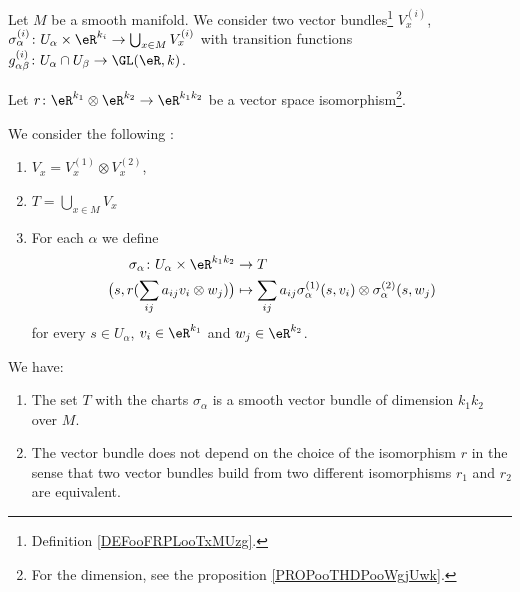 \begin{propositionDef}		\label{DEFooCSDZooJuzGuE}
	Let \( M \) be a smooth manifold. We consider two vector bundles\footnote{Definition \ref{DEFooFRPLooTxMUzg}.} \( V_x^{(i)}\), \( \sigma_{\alpha}^{(i)}  \colon U_{\alpha}\times \eR^{k_i}\to \bigcup_{x\in M}V_x^{(i)} \) with transition functions \(g_{\alpha\beta}^{(i)} \colon U_{\alpha}\cap U_{\beta}\to \GL(\eR,k)  \).

	Let \(r \colon \eR^{k_1}\otimes \eR^{k_2}\to \eR^{k_1k_2}  \) be a vector space isomorphism\footnote{For the dimension, see the proposition \ref{PROPooTHDPooWgjUwk}.}.

	We consider the following :
	\begin{enumerate}
		\item
		      \( V_x=V_x^{(1)}\otimes V_x^{(2)}\),
		\item
		      \( T=\bigcup_{x\in M}V_x\)
		\item For each \( \alpha\) we define
		      \begin{equation}		\label{EQooXHURooBpOMlU}
			      \begin{aligned}
				      \sigma_{\alpha}\colon U_{\alpha}\times \eR^{k_1k_2} & \to T                                                                                   \\
				      \big( s, r(\sum_{ij}a_{ij} v_i\otimes w_j) \big)    & \mapsto \sum_{ij}a_{ij}\sigma_{\alpha}^{(1)}(s,v_i)\otimes \sigma_{\alpha}^{(2)}(s,w_j)
			      \end{aligned}
		      \end{equation}
		      for every \( s\in U_{\alpha}\), \( v_i\in \eR^{k_1}\) and \( w_j\in \eR^{k_2}\).
	\end{enumerate}

	We have:
	\begin{enumerate}
		\item
		      The set	\( T\) with the charts \( \sigma_{\alpha} \) is a smooth vector bundle of dimension \( k_1k_2\) over \( M\).
		\item
		      The vector bundle does not depend on the choice of the isomorphism \( r\) in the sense that two vector bundles build from two different isomorphisms \( r_1\) and \( r_2\) are equivalent.
	\end{enumerate}
\end{propositionDef}

